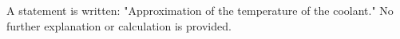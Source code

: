 A statement is written:  
"Approximation of the temperature of the coolant."  
No further explanation or calculation is provided.